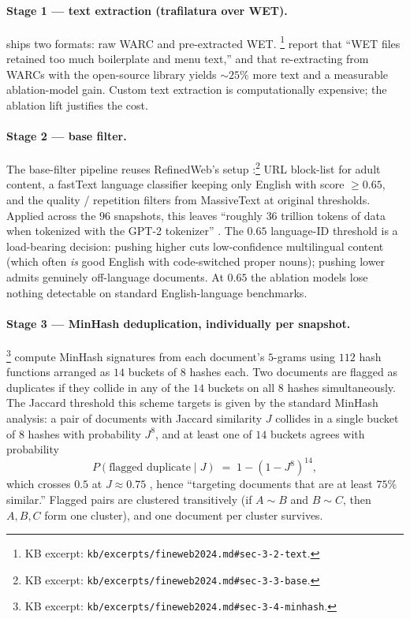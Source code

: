 \paragraph{Stage 1 --- text extraction (trafilatura over WET).}
 ships two formats: raw WARC and pre-extracted WET.
\citet[\S 3.2]{fineweb2024}\footnote{KB excerpt:
\texttt{kb/excerpts/fineweb2024.md\#sec-3-2-text}.} report that
``WET files retained too much boilerplate and menu text,'' and that
re-extracting from WARCs with the open-source \texttt{}
library yields $\sim 25\%$ more text and a measurable ablation-model
gain. Custom text extraction is computationally expensive; the
ablation lift justifies the cost.

\paragraph{Stage 2 --- base filter.}
The base-filter pipeline reuses RefinedWeb's setup
\citep[\S 3.3]{fineweb2024}:\footnote{KB excerpt:
\texttt{kb/excerpts/fineweb2024.md\#sec-3-3-base}.} URL block-list
for adult content, a fastText language classifier keeping only
English with score $\geq 0.65$, and the quality / repetition filters
from MassiveText at original thresholds. Applied across the $96$
snapshots, this leaves ``roughly $36$ trillion tokens of data when
tokenized with the GPT-2 tokenizer''
\citep[\S 3.3]{fineweb2024}. The $0.65$ language-ID threshold is a
load-bearing decision: pushing higher cuts low-confidence multilingual
content (which often \emph{is} good English with code-switched
proper nouns); pushing lower admits genuinely off-language documents.
At $0.65$ the ablation models lose nothing detectable on standard
English-language benchmarks.

\paragraph{Stage 3 --- MinHash deduplication, individually per snapshot.}
\citet[\S 3.4]{fineweb2024}\footnote{KB excerpt:
\texttt{kb/excerpts/fineweb2024.md\#sec-3-4-minhash}.} compute
MinHash signatures from each document's $5$-grams using $112$ hash
functions arranged as $14$ buckets of $8$ hashes each. Two documents
are flagged as duplicates if they collide in any of the $14$ buckets
on all $8$ hashes simultaneously. The Jaccard threshold this scheme
targets is given by the standard MinHash analysis: a pair of
documents with Jaccard similarity $J$ collides in a single bucket of
$8$ hashes with probability $J^{8}$, and at least one of $14$
buckets agrees with probability
\begin{equation}
P(\text{flagged duplicate} \mid J) \;=\; 1 - (1 - J^{8})^{14},
\label{eq:minhash}
\end{equation}
which crosses $0.5$ at $J \approx 0.75$
\citep[\S 3.4]{fineweb2024}, hence ``targeting documents that are
at least $75\%$ similar.'' Flagged pairs are clustered transitively
(if $A \sim B$ and $B \sim C$, then $A, B, C$ form one cluster), and
one document per cluster survives.

